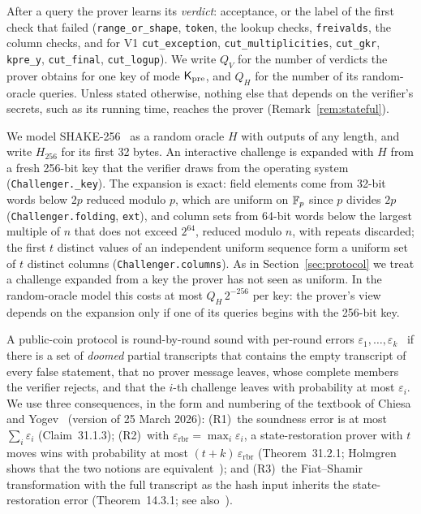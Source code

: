  After a query the prover learns its \emph{verdict}: acceptance,
or the label of the first check that failed (\texttt{range\_or\_shape}, \texttt{token}, the lookup
checks, \texttt{freivalds}, the column checks, and for V1 \texttt{cut\_exception},
\texttt{cut\_multiplicities}, \texttt{cut\_gkr}, \texttt{kpre\_y}, \texttt{cut\_final},
\texttt{cut\_logup}). We write $Q_V$ for the number of verdicts the prover obtains for one key of
mode $\mathsf{K}_{\mathrm{pre}}$, and $Q_H$ for the number of its random-oracle
queries. Unless stated otherwise, nothing else that depends on the verifier's secrets, such as its
running time, reaches the prover (Remark~\ref{rem:stateful}).

 We model SHAKE-256~\cite{fips202} as a random oracle $H$ with
outputs of any length, and write $H_{256}$ for its first 32 bytes. An interactive challenge is
expanded with $H$ from a fresh 256-bit key that the verifier draws from the operating system
(\texttt{Challenger.\_key}). The expansion is exact: field elements come from 32-bit words below
$2p$ reduced modulo $p$, which are uniform on $\mathbb{F}_p$ since $p$ divides $2p$
(\texttt{Challenger.folding}, \texttt{ext}), and column sets from 64-bit words below the largest
multiple of $n$ that does not exceed $2^{64}$, reduced modulo $n$, with repeats discarded; the
first $t$ distinct values of an independent uniform sequence form a uniform set of $t$ distinct
columns (\texttt{Challenger.columns}). As in Section~\ref{sec:protocol} we treat a
challenge expanded from a key the prover has not seen as uniform. In the random-oracle model this
costs at most $Q_H\,2^{-256}$ per key: the prover's view depends on the expansion only if one of its
queries begins with the 256-bit key.

 A public-coin protocol is round-by-round sound with per-round
errors $\varepsilon_1,\dots,\varepsilon_k$~\cite{canetti2019fs} if there is a set of \emph{doomed}
partial transcripts that contains the empty transcript of every false statement, that no prover
message leaves, whose complete members the verifier rejects, and that the $i$-th challenge leaves
with probability at most $\varepsilon_i$. We use three consequences, in the form and numbering of
the textbook of Chiesa and Yogev~\cite{chiesa2024snargs} (version of 25 March 2026):
(R1)~the soundness error is at most $\sum_i\varepsilon_i$ (Claim~31.1.3);
(R2)~with $\varepsilon_{\mathrm{rbr}}=\max_i\varepsilon_i$, a state-restoration prover with $t$
moves wins with probability at most $(t+k)\,\varepsilon_{\mathrm{rbr}}$ (Theorem~31.2.1; Holmgren
shows that the two notions are equivalent~\cite{holmgren2019rbr}); and
(R3)~the Fiat--Shamir transformation with the full transcript as the hash input inherits the
state-restoration error (Theorem~14.3.1; see also~\cite{bcs16}).

